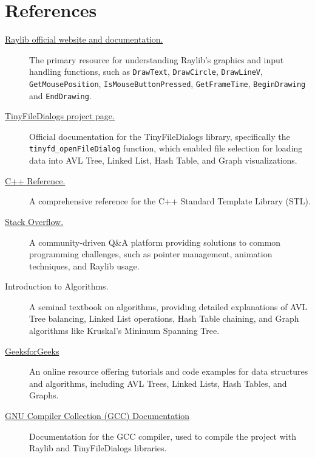 \documentclass{article}
\begin{document}
\section{References}
\begin{description}
	\item[\href{https://www.raylib.com/}{Raylib official website and documentation.}] The primary resource for understanding Raylib's graphics and input handling functions, such as \lstinline|DrawText|, \lstinline|DrawCircle|, \lstinline|DrawLineV|, \lstinline|GetMousePosition|, \lstinline|IsMouseButtonPressed|, \lstinline|GetFrameTime|, \lstinline|BeginDrawing| and \lstinline|EndDrawing|.
	\item[\href{https://sourceforge.net/projects/tinyfiledialogs/}{TinyFileDialogs project page.}] Official documentation for the TinyFileDialogs library, specifically the \lstinline|tinyfd_openFileDialog| function, which enabled file selection for loading data into AVL Tree, Linked List, Hash Table, and Graph visualizations.
	\item[\href{https://en.cppreference.com/w/}{C++ Reference.}] A comprehensive reference for the C++ Standard Template Library (STL).
	\item[\href{https://stackoverflow.com/}{Stack Overflow.}] A community-driven Q\&A platform providing solutions to common programming challenges, such as pointer management, animation techniques, and Raylib usage.
	\item[Introduction to Algorithms.] A seminal textbook on algorithms, providing detailed explanations of AVL Tree balancing, Linked List operations, Hash Table chaining, and Graph algorithms like Kruskal's Minimum Spanning Tree.
	\item[\href{https://www.geeksforgeeks.org/}{GeeksforGeeks}] An online resource offering tutorials and code examples for data structures and algorithms, including AVL Trees, Linked Lists, Hash Tables, and Graphs.
	\item[\href{https://gcc.gnu.org/onlinedocs/}{GNU Compiler Collection (GCC) Documentation}] Documentation for the GCC compiler, used to compile the project with Raylib and TinyFileDialogs libraries.
\end{description}
\end{document}
